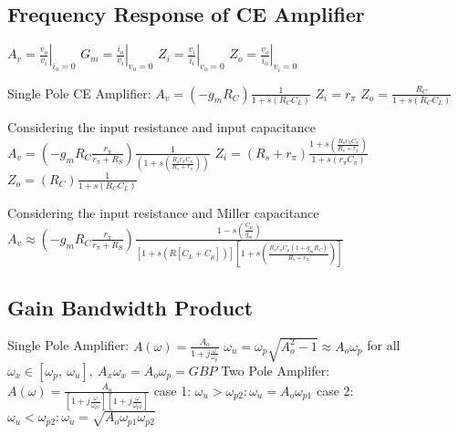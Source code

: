 \documentclass[a4paper,11pt]{article}
\begin{document}
	\subsection{Frequency Response of CE Amplifier}
	\begin{outline}[enumerate]
		\1 $A_{v} = \left. \frac{v_{o}}{v_{i}} \right|_{i_{o} = 0}$
		\1 $G_{m} = \left. \frac{i_{o}}{v_{i}} \right|_{v_{o} = 0}$
		\1 $Z_{i} = \left. \frac{v_{i}}{i_{i}} \right|_{v_{o} = 0}$
		\1 $Z_{o} = \left. \frac{v_{o}}{i_{o}} \right|_{v_{i} = 0}$
	
		\1 Single Pole CE Amplifier:
			\2 $A_{v} = \left(-g_{m}R_{C}\right) \frac{1}{1 + s\left( R_{C}C_{L} \right)}$
			\2 $Z_{i} = r_{\pi}$
			\2 $Z_{o} = \frac{R_{C}}{1 + s\left(R_{C}C_{L}\right)}$

		\1 Considering the input resistance and input capacitance
			\2 $A_{v} = \left(-g_{m}R_{C} \frac{r_{\pi}}{r_{\pi} + R_{S}}\right) \frac{1}{\left( 1 + s \left( \frac{R_{s}r_{\pi}C_{\pi}}{R_{s} + r_{\pi}} \right) \right)}$
			\2 $Z_{i} = \left(R_{s} + r_{\pi}\right) \frac{1 + s \left( \frac{R_{s}r_{\pi}C_{\pi}}{R_{s} + r_{\pi}} \right)}{1 + s\left( r_{\pi}C_{\pi} \right)}$
			\2 $Z_{o} = \left(R_{C}\right)\frac{1}{1 + s\left(R_{C}C_{L}\right)}$

		\1 Considering the input resistance and Miller capacitance
			\2 $A_{v} \approx \left(-g_{m}R_{C} \frac{r_{\pi}}{r_{\pi} + R_{S}}\right) \frac{1 - s\left( \frac{C_{\mu}}{g_{m}} \right)}{\left[ 1 + s\left( R\left[ C_{L} + C_{\mu} \right] \right) \right] \left[ 1 + s \left( \frac{R_{s}r_{\pi}C_{\mu} \left(1 + g_{m}R_{C} \right)}{R_{s} + r_{\pi}} \right) \right]}$
	\end{outline}

	\subsection{Gain Bandwidth Product}
	\begin{outline}[enumerate]
		\1 Single Pole Amplifier: $A \left(\omega\right) = \frac{A_{o}}{1 + j\frac{\omega}{\omega_{p}}}$
			\2 $\omega_{u} =  \omega_{p}\sqrt{A_{o}^{2} - 1} \approx A_{o}\omega_{p}$
			\2 for all $\omega_{x} \in \left[ \omega_{p},~\omega_{u} \right],~A_{x}\omega_{x} = A_{o}\omega_{p} = GBP$
		\1 Two Pole Amplifer: $A \left(\omega\right) = \frac{A_{o}}{\left[ 1 + j\frac{\omega}{\omega_{p1}} \right] \left[ 1 + j\frac{\omega}{\omega_{p2}} \right]}$
			\2 case 1: $\omega_{u} > \omega_{p2} : \omega_{u} = A_{o}\omega_{p1}$
			\2 case 2: $\omega_{u} < \omega_{p2} : \omega_{u} = \sqrt{A_{o}\omega_{p1}\omega_{p2}}$
	\end{outline}
\end{document}
